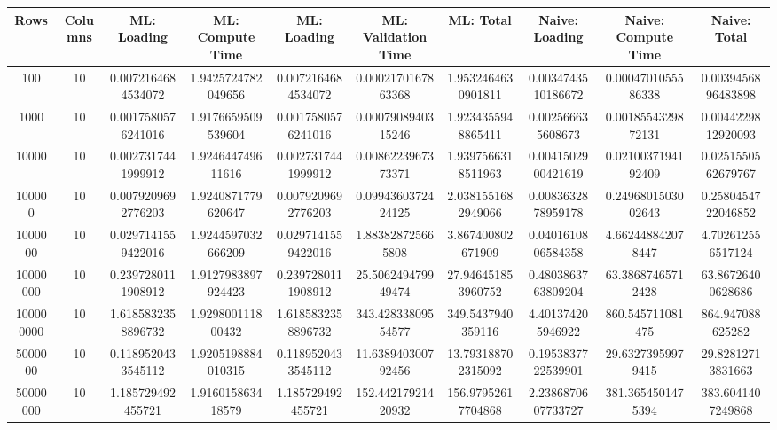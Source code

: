\begin{table}[htb]
    \centering
    \begin{tabular}{@{}cccccccccc@{}}
        \toprule
        Rows & Columns & ML: Loading & ML: Compute Time & ML: Loading & ML: Validation Time & ML: Total & Naive: Loading & Naive: Compute Time & Naive: Total \\
        \midrule
        100 & 10 & 0.0072164684534072 & 1.9425724782049656 & 0.0072164684534072 & 0.0002170167863368 & 1.9532464630901811 & 0.0034743510186672 & 0.0004701055586338 & 0.0039456896483898 \\
        1000 & 10 & 0.0017580576241016 & 1.9176659509539604 & 0.0017580576241016 & 0.0007908940315246 & 1.9234355948865411 & 0.002566635608673 & 0.0018554329872131 & 0.0044229812920093 \\
        10000 & 10 & 0.0027317441999912 & 1.924644749611616 & 0.0027317441999912 & 0.0086223967373371 & 1.9397566318511963 & 0.0041502900421619 & 0.0210037194192409 & 0.0251550562679767 \\
        100000 & 10 & 0.0079209692776203 & 1.9240871779620647 & 0.0079209692776203 & 0.0994360372424125 & 2.0381551682949066 & 0.0083632878959178 & 0.2496801503002643 & 0.2580454722046852 \\
        1000000 & 10 & 0.0297141559422016 & 1.9244597032666209 & 0.0297141559422016 & 1.883828725665808 & 3.867400802671909 & 0.0401610806584358 & 4.662448842078447 & 4.702612556517124 \\
        10000000 & 10 & 0.2397280111908912 & 1.9127983897924423 & 0.2397280111908912 & 25.506249479949474 & 27.946451853960752 & 0.4803863763809204 & 63.38687465712428 & 63.86726400628686 \\
        100000000 & 10 & 1.6185832358896732 & 1.929800111800432 & 1.6185832358896732 & 343.42833809554577 & 349.5437940359116 & 4.401374205946922 & 860.545711081475 & 864.947088625282 \\
        5000000 & 10 & 0.1189520433545112 & 1.9205198884010315 & 0.1189520433545112 & 11.638940300792456 & 13.793188702315092 & 0.1953837722539901 & 29.63273959979415 & 29.82812713831663 \\
        50000000 & 10 & 1.185729492455721 & 1.916015863418579 & 1.185729492455721 & 152.44217921420932 & 156.97952617704868 & 2.2386870607733727 & 381.3654501475394 & 383.6041407249868 \\
        \bottomrule
    \end{tabular}
\end{table}